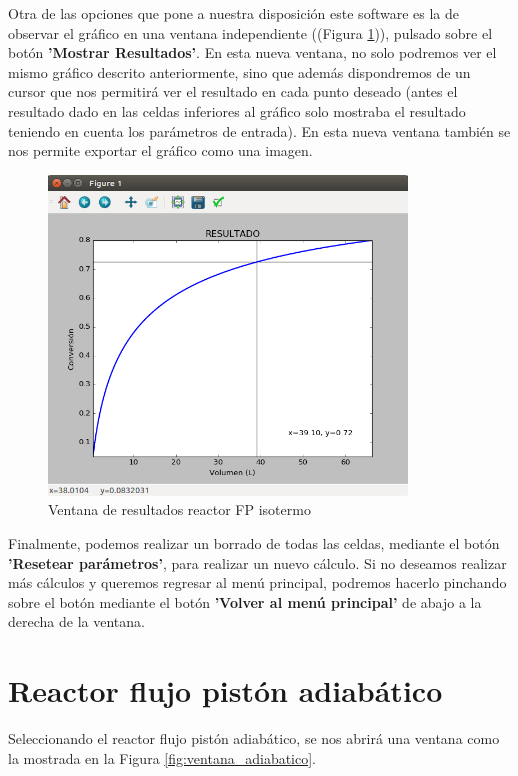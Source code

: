 Otra de las opciones que pone a nuestra disposición este software es la de observar el gráfico en una ventana independiente ((Figura \ref{fig:ventana_graficas_iso})), pulsado sobre el botón \textbf{'Mostrar Resultados'}. En esta nueva ventana, no solo podremos ver el mismo gráfico descrito anteriormente, sino que además dispondremos de un cursor que nos permitirá ver el resultado en cada punto deseado (antes el resultado dado en las celdas inferiores al gráfico solo mostraba el resultado teniendo en cuenta los parámetros de entrada). En esta nueva ventana también se nos permite exportar el gráfico como una imagen.

\begin{figure}[h!]
	\begin{center}
		\includegraphics[width=0.85\textwidth]{./imagenes/reactor_fp/isotermo2.png}\caption{Ventana de resultados reactor FP isotermo}\label{fig:ventana_graficas_iso}
	\end{center}
\end{figure}

Finalmente, podemos realizar un borrado de todas las celdas, mediante el botón \textbf{'Resetear parámetros'}, para realizar un nuevo cálculo. Si no deseamos realizar más cálculos y queremos regresar al menú principal, podremos hacerlo pinchando sobre el botón mediante el botón \textbf{'Volver al menú principal'} de abajo a la derecha de la ventana.


\section{Reactor flujo pistón adiabático}
Seleccionando el reactor flujo pistón adiabático, se nos abrirá una ventana como la mostrada en la Figura \ref{fig:ventana_adiabatico}.

